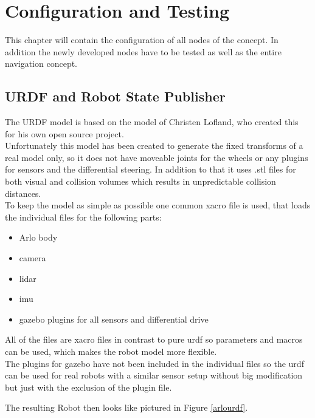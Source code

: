 \chapter{Configuration and Testing}
\label{configurationandtesting}

This chapter will contain the configuration of all nodes of the concept. In addition the newly developed nodes have to be tested as well as the entire navigation concept.

\section{URDF and Robot State Publisher}

The URDF model is based on the model of Christen Lofland, who created this for his own open source project\cite{chrisl8}.\\

Unfortunately this model has been created to generate the fixed transforms of a real model only, so it does not have moveable joints for the wheels or any plugins for sensors and the differential steering. In addition to that it uses .stl files for both visual and collision volumes which results in unpredictable collision distances.\\

To keep the model as simple as possible one common xacro file is used, that loads the individual files for the following parts:
\begin{itemize}
	\item Arlo body
	\item camera
	\item lidar
	\item imu
	\item gazebo plugins for all sensors and differential drive
\end{itemize}

All of the files are xacro files in contrast to pure urdf so parameters and macros can be used, which makes the robot model more flexible.\\

The plugins for gazebo have not been included in the individual files so the urdf can be used for real robots with a similar sensor setup without big modification but just with the exclusion of the plugin file.

The resulting Robot then looks like pictured in Figure \ref{arlourdf}.

